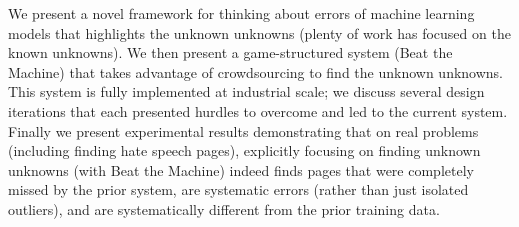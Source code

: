 We present a novel framework for thinking about errors of machine learning models that highlights the unknown unknowns (plenty of work has focused on the known unknowns).  We then present a game-structured system (Beat the Machine) that takes advantage of crowdsourcing to find the unknown unknowns.  This system is fully implemented at industrial scale; we discuss several design iterations that each presented hurdles to overcome and led to the current system.  Finally we present experimental results demonstrating that on real problems (including finding hate speech pages), explicitly focusing on finding unknown unknowns (with Beat the Machine) indeed finds pages that were completely missed by the prior system, are systematic errors (rather than just isolated outliers), and are systematically different from the prior training data.

